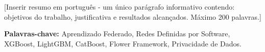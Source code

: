 \section*{}

[Inserir resumo em português - um único parágrafo informativo contendo: objetivos do trabalho, justificativa e resultados alcançados. Máximo 200 palavras.]

{\bf Palavras-chave:} Aprendizado Federado, Redes Definidas por Software, XGBoost, LightGBM, CatBoost, Flower Framework, Privacidade de Dados.

